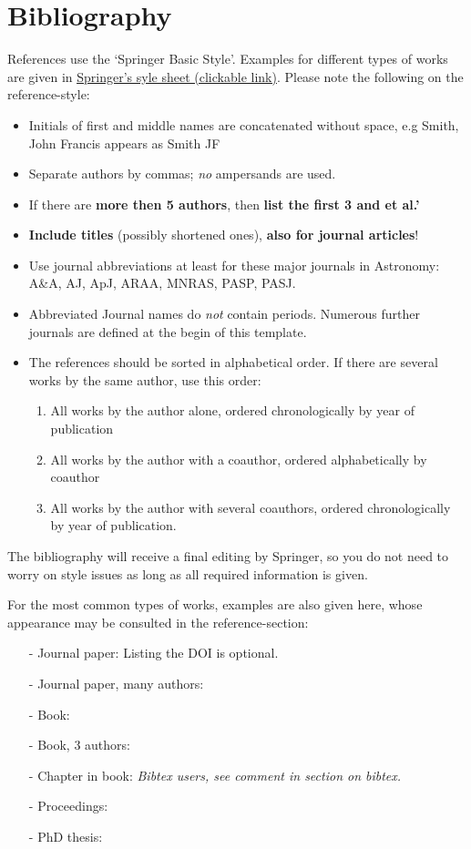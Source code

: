 \documentclass[graybox,natbib,nosecnum]{svmult}
\begin{document}
\section{Bibliography}
References use the `Springer Basic Style'. Examples for different types of works are given in \href{https://meteor.springer.com/exoplanets/?id=435&tab=About&mode=ReadPage&entity=3283}{\ul{Springer's syle sheet (clickable link)}}. 
\noindent Please note the following on the reference-style:
\begin{itemize}
\item{Initials of first and middle names are concatenated without space, e.g Smith, John Francis appears as Smith JF}
\item{Separate authors by commas; \emph{no} ampersands are used.}
\item{If there are {\bf more then 5 authors}, then {\bf list the first 3 and et al.'}}
\item{{\bf Include titles} (possibly shortened ones), {\bf also for journal articles}!  }
\item{Use journal abbreviations at least for these major journals in Astronomy: A\&A, AJ, ApJ, ARAA, MNRAS, PASP, PASJ. }
\item{Abbreviated Journal names do \emph{not} contain periods. Numerous further journals are defined at the begin of this template. }
\item{The references should be sorted in alphabetical order. If there are several works by the same author, use this order: }
\begin{enumerate}
\item All works by the author alone, ordered chronologically by year of publication
\item All works by the author with a coauthor, ordered alphabetically by coauthor
\item All works by the author with several coauthors, ordered chronologically by year of publication.
\end{enumerate}
\end{itemize}
The bibliography will receive a final editing by Springer, so you do not need to worry on style issues as long as all required information is given.

For the most common types of works, examples are also given here, whose appearance may be consulted in the reference-section: 
\begin{itemize}
\item[-]{Journal paper: \citep{2013A&A...550A..67P} Listing the DOI is optional. }
\item[-]{Journal paper, many authors: \citep{almenara09} }
\item[-]{Book: \citep{all73}  }
\item[-]{Book, 3 authors: \citep{giclas+71}  }
\item[-]{Chapter in book: \citep{2015hae..book.1501B}  \emph{Bibtex users, see comment in section on bibtex.} }
\item[-]{Proceedings:  \citep{Boisnard06}  }
\item[-]{PhD thesis: \citep{AlmenaraThesis10}  }
\end{itemize}
\end{document}
